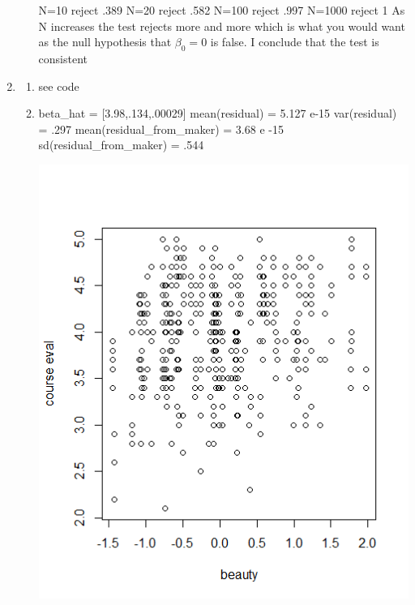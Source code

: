 \documentclass{article}
\begin{document}
\begin{enumerate}
\begin{enumerate}
				
				N=10 reject .389\newline
				N=20 reject .582\newline
				N=100 reject .997\newline
				N=1000 reject 1\newline
				\newline
				As N increases the test rejects more and more which is what you would want as the null hypothesis that $\beta_{0}=0$ is false. I conclude that the test is consistent
			\end{enumerate}
	\item
			\begin{enumerate}
				\item see code
				\item beta\_hat = [3.98,.134,.00029] \newline
				mean(residual) = 5.127 e-15 \newline
				var(residual) = .297 \newline
				mean(residual\_from\_maker) = 3.68 e -15 \newline
				sd(residual\_from\_maker) = .544 \newline
				\begin{center}
					\includegraphics{scatterplot}
				\end{center}
				 

\end{enumerate}
\end{enumerate}
\end{document}

